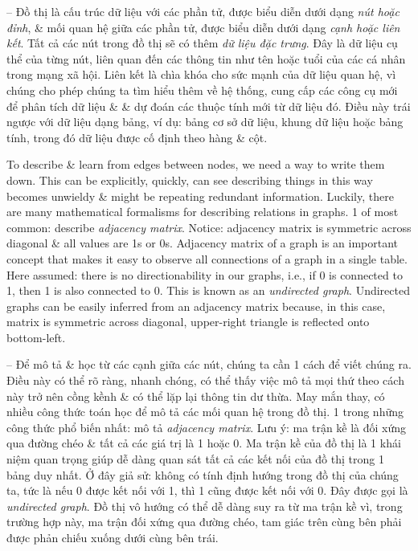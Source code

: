 \documentclass{article}
\begin{document}
\begin{itemize}
\begin{itemize}
\begin{itemize}
            -- Đồ thị là cấu trúc dữ liệu với các phần tử, được biểu diễn dưới dạng {\it nút hoặc đỉnh}, \& mối quan hệ giữa các phần tử, được biểu diễn dưới dạng {\it cạnh hoặc liên kết}. Tất cả các nút trong đồ thị sẽ có thêm {\it dữ liệu đặc trưng}. Đây là dữ liệu cụ thể của từng nút, liên quan đến các thông tin như tên hoặc tuổi của các cá nhân trong mạng xã hội. Liên kết là chìa khóa cho sức mạnh của dữ liệu quan hệ, vì chúng cho phép chúng ta tìm hiểu thêm về hệ thống, cung cấp các công cụ mới để phân tích dữ liệu \& \& dự đoán các thuộc tính mới từ dữ liệu đó. Điều này trái ngược với dữ liệu dạng bảng, ví dụ: bảng cơ sở dữ liệu, khung dữ liệu hoặc bảng tính, trong đó dữ liệu được cố định theo hàng \& cột.

            To describe \& learn from edges between nodes, we need a way to write them down. This can be explicitly, quickly, can see describing things in this way becomes unwieldy \& might be repeating redundant information. Luckily, there are many mathematical formalisms for describing relations in graphs. 1 of most common: describe {\it adjacency matrix}. Notice: adjacency matrix is symmetric across diagonal \& all values are 1s or 0s. Adjacency matrix of a graph is an important concept that makes it easy to observe all connections of a graph in a single table. Here assumed: there is no directionability in our graphs, i.e., if 0 is connected to 1, then 1 is also connected to 0. This is known as an {\it undirected graph}. Undirected graphs can be easily inferred from an adjacency matrix because, in this case, matrix is symmetric across diagonal, upper-right triangle is reflected onto bottom-left.

            -- Để mô tả \& học từ các cạnh giữa các nút, chúng ta cần 1 cách để viết chúng ra. Điều này có thể rõ ràng, nhanh chóng, có thể thấy việc mô tả mọi thứ theo cách này trở nên cồng kềnh \& có thể lặp lại thông tin dư thừa. May mắn thay, có nhiều công thức toán học để mô tả các mối quan hệ trong đồ thị. 1 trong những công thức phổ biến nhất: mô tả {\it adjacency matrix}. Lưu ý: ma trận kề là đối xứng qua đường chéo \& tất cả các giá trị là 1 hoặc 0. Ma trận kề của đồ thị là 1 khái niệm quan trọng giúp dễ dàng quan sát tất cả các kết nối của đồ thị trong 1 bảng duy nhất. Ở đây giả sử: không có tính định hướng trong đồ thị của chúng ta, tức là nếu 0 được kết nối với 1, thì 1 cũng được kết nối với 0. Đây được gọi là {\it undirected graph}. Đồ thị vô hướng có thể dễ dàng suy ra từ ma trận kề vì, trong trường hợp này, ma trận đối xứng qua đường chéo, tam giác trên cùng bên phải được phản chiếu xuống dưới cùng bên trái.


\end{itemize}
\end{itemize}
\end{itemize}
\end{document}
